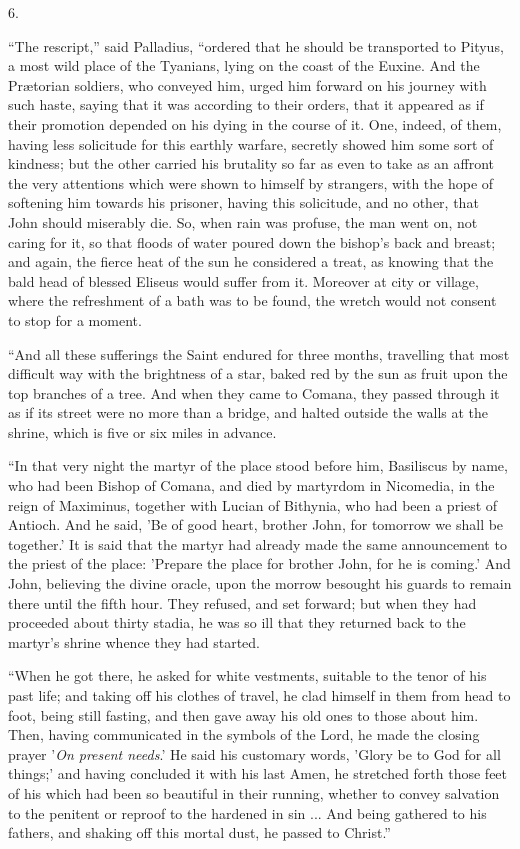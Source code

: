 6.

``The rescript,'' said Palladius, ``ordered that he
should be transported to Pityus, a most wild place of the Tyanians,
lying on the coast of the Euxine. And the Prætorian soldiers, who
conveyed him, urged him forward on his journey with such haste, saying
that it was according to their orders, that it appeared as if their
promotion depended on his dying in the course of it. One,
indeed, of them, having less solicitude for this earthly warfare,
secretly showed him some sort of kindness; but the other carried his
brutality so far as even to take as an affront the very attentions
which were shown to himself by strangers, with the hope of softening
him towards his prisoner, having this solicitude, and no other, that
John should miserably die. So, when rain was profuse, the man went on,
not caring for it, so that floods of water poured down the bishop's
back and breast; and again, the fierce heat of the sun he considered a
treat, as knowing that the bald head of blessed Eliseus would suffer
from it. Moreover at city or village, where the refreshment of a bath
was to be found, the wretch would not consent to stop for a moment.

``And all these sufferings the Saint endured for three months,
travelling that most difficult way with the brightness of a star,
baked red by the sun as fruit upon the top branches of a tree. And
when they came to Comana, they passed through it as if its street were
no more than a bridge, and halted outside the walls at the shrine,
which is five or six miles in advance.

``In that very night the martyr of the place stood before him,
Basiliscus by name, who had been Bishop of Comana, and died by
martyrdom in Nicomedia, in the reign of Maximinus, together with
Lucian of Bithynia, who had been a priest of Antioch. And he said, 'Be
of good heart, brother John, for tomorrow we shall be together.' It is
said that the martyr had already made the same announcement to the
priest of the place: 'Prepare the place for brother John, for he is
coming.' And John, believing the divine oracle, upon the morrow
besought his guards to remain there until the fifth hour. They
refused, and set forward; but when they had proceeded about thirty
stadia, he was so ill that they returned back to the martyr's
shrine whence they had started.

``When he got there, he asked for white vestments, suitable to
the tenor of his past life; and taking off his clothes of travel, he
clad himself in them from head to foot, being still fasting, and then
gave away his old ones to those about him. Then, having communicated
in the symbols of the Lord, he made the closing prayer '\emph{On present
needs}.' He said his customary words, 'Glory be to God for all
things;' and having concluded it with his last Amen, he stretched
forth those feet of his which had been so beautiful in their running,
whether to convey salvation to the penitent or reproof to the hardened
in sin ... And being gathered to his fathers, and shaking off this
mortal dust, he passed to Christ.''

